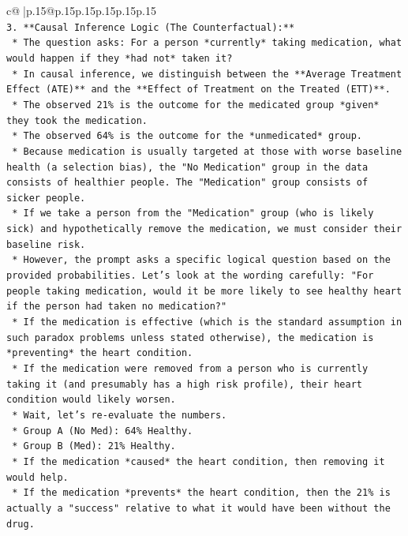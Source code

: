 \documentclass{article}
\begin{document}
{\begin{supertabular}{c@{$\;$}|p{.15\linewidth}@{}p{.15\linewidth}p{.15\linewidth}p{.15\linewidth}p{.15\linewidth}p{.15\linewidth}}
{{{\\ 
\texttt{3.  **Causal Inference Logic (The Counterfactual):**} \\
\texttt{    *   The question asks: For a person *currently* taking medication, what would happen if they *had not* taken it?} \\
\texttt{    *   In causal inference, we distinguish between the **Average Treatment Effect (ATE)** and the **Effect of Treatment on the Treated (ETT)**.} \\
\texttt{    *   The observed 21\% is the outcome for the medicated group *given* they took the medication.} \\
\texttt{    *   The observed 64\% is the outcome for the *unmedicated* group.} \\
\texttt{    *   Because medication is usually targeted at those with worse baseline health (a selection bias), the "No Medication" group in the data consists of healthier people. The "Medication" group consists of sicker people.} \\
\texttt{    *   If we take a person from the "Medication" group (who is likely sick) and hypothetically remove the medication, we must consider their baseline risk.} \\
\texttt{    *   However, the prompt asks a specific logical question based on the provided probabilities. Let's look at the wording carefully: "For people taking medication, would it be more likely to see healthy heart if the person had taken no medication?"} \\
\texttt{    *   If the medication is effective (which is the standard assumption in such paradox problems unless stated otherwise), the medication is *preventing* the heart condition.} \\
\texttt{    *   If the medication were removed from a person who is currently taking it (and presumably has a high risk profile), their heart condition would likely worsen.} \\
\texttt{    *   Wait, let's re{-}evaluate the numbers.} \\
\texttt{        *   Group A (No Med): 64\% Healthy.} \\
\texttt{        *   Group B (Med): 21\% Healthy.} \\
\texttt{    *   If the medication *caused* the heart condition, then removing it would help.} \\
\texttt{    *   If the medication *prevents* the heart condition, then the 21\% is actually a "success" relative to what it would have been without the drug.} \\
}}}
\end{supertabular}}
\end{document}
